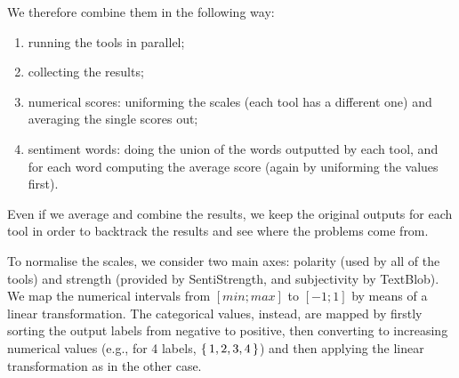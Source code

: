 We therefore combine them in the following way:
\begin{enumerate}
    \item running the tools in parallel;
    \item collecting the results;
    \item numerical scores: uniforming the scales (each tool has a different one) and averaging the single scores out;
    \item sentiment words: doing the union of the words outputted by each tool, and for each word computing the average score (again by uniforming the values first).
\end{enumerate}



Even if we average and combine the results, we keep the original outputs for each tool in order to backtrack the results and see where the problems come from.

To normalise the scales, we consider two main axes: polarity (used by all of the tools) and strength (provided by SentiStrength, and subjectivity by TextBlob). We map the numerical intervals from $[min;max]$ to $[-1;1]$ by means of a linear transformation. The categorical values, instead, are mapped by firstly sorting the output labels from negative to positive, then converting to increasing numerical values (e.g., for 4 labels, $\set{1,2,3,4}$) and then applying the linear transformation as in the other case.



